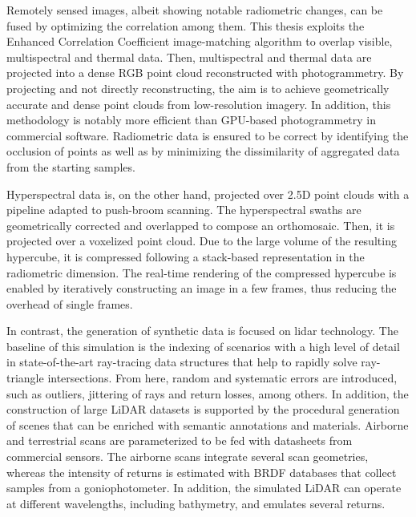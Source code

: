 Remotely sensed images, albeit showing notable radiometric changes, can be fused by optimizing the correlation among them. This thesis exploits the Enhanced Correlation Coefficient image-matching algorithm to overlap visible, multispectral and thermal data. Then, multispectral and thermal data are projected into a dense RGB point cloud reconstructed with photogrammetry. By projecting and not directly reconstructing, the aim is to achieve geometrically accurate and dense point clouds from low-resolution imagery. In addition, this methodology is notably more efficient than GPU-based photogrammetry in commercial software. Radiometric data is ensured to be correct by identifying the occlusion of points as well as by minimizing the dissimilarity of aggregated data from the starting samples. 


Hyperspectral data is, on the other hand, projected over 2.5D point clouds with a pipeline adapted to push-broom scanning. The hyperspectral swaths are geometrically corrected and overlapped to compose an orthomosaic. Then, it is projected over a voxelized point cloud. Due to the large volume of the resulting hypercube, it is compressed following a stack-based representation in the radiometric dimension. The real-time rendering of the compressed hypercube is enabled by iteratively constructing an image in a few frames, thus reducing the overhead of single frames. 

In contrast, the generation of synthetic data is focused on \acrshort{lidar} technology. The baseline of this simulation is the indexing of scenarios with a high level of detail in state-of-the-art ray-tracing data structures that help to rapidly solve ray-triangle intersections. From here, random and systematic errors are introduced, such as outliers, jittering of rays and return losses, among others. In addition, the construction of large LiDAR datasets is supported by the procedural generation of scenes that can be enriched with semantic annotations and materials. Airborne and terrestrial scans are parameterized to be fed with datasheets from commercial sensors. The airborne scans integrate several scan geometries, whereas the intensity of returns is estimated with BRDF databases that collect samples from a goniophotometer. In addition, the simulated LiDAR can operate at different wavelengths, including bathymetry, and emulates several returns.

